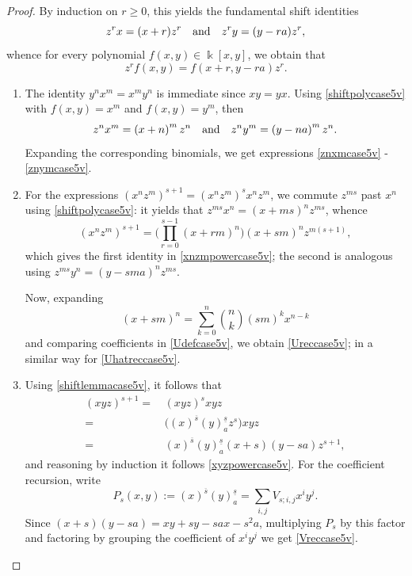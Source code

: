 \documentclass{amsart}
\theoremstyle{definition}
\theoremstyle{remark}
\numberwithin{equation}{section}
\begin{document}
\begin{proof} 
By induction on $r\ge 0$, this yields the fundamental shift identities
\begin{equation}\label{shiftlemmacase5v}
z^{r}x=(x+r)z^{r} \quad {\rm and} \quad z^{r}y=(y-ra)z^{r},
\end{equation}
whence for every polynomial $f(x,y)\in\Bbbk[x,y]$, we obtain that 
\begin{equation}\label{shiftpolycase5v}
z^{r}f(x,y)=f(x+r,y-ra) z^{r}.
\end{equation}
\begin{enumerate}
\item [\rm (1)] The identity $y^n x^m=x^m y^n$ is immediate since $xy=yx$. Using \eqref{shiftpolycase5v} with $f(x,y)=x^m$ and $f(x,y)=y^m$, then
$$
z^n x^m = \left(x + n\right)^m z^n \quad {\rm and} \quad z^n y^m = \left(y - na\right)^m z^n.
$$
Expanding the corresponding binomials, we get expressions \eqref{znxmcase5v} - \eqref{znymcase5v}.

\item [\rm (2)] For the expressions $(x^n z^m)^{s+1}=(x^n z^m)^s x^n z^m$, we commute $z^{ms}$ past $x^n$ using \eqref{shiftpolycase5v}: it yields that $z^{ms}x^n=(x+ms)^n z^{ms}$, whence 
\[
\left(x^n z^m\right)^{s+1} = \Big(\prod_{r=0}^{s-1}\left(x + rm\right)^n\Big)\left(x+sm\right)^n z^{m(s+1)},
\]
which gives the first identity in \eqref{xnzmpowercase5v}; the second is analogous using $z^{ms}y^n=(y-sma)^n z^{ms}$. 

Now, expanding 
$$
\left(x + sm\right)^n = \sum_{k=0}^{n}\binom{n}{k}(sm)^k x^{n-k}
$$ 
and comparing coefficients in \eqref{Udefcase5v}, we obtain \eqref{Ureccase5v}; in a similar way for  \eqref{Uhatreccase5v}.
\item [\rm (3)] Using \eqref{shiftlemmacase5v}, it follows that 
\begin{align*}
        (xyz)^{s+1} = &\, (xyz)^s xyz \\
        = &\, \Big((x)^{\overline{s}}(y)^{\underline{s}}_{a}z^{s}\Big)xyz \\
        = &\, (x)^{\overline{s}}(y)^{\underline{s}}_{a}(x+s)(y-sa)z^{s+1},
\end{align*}
and reasoning by induction it follows \eqref{xyzpowercase5v}. For the coefficient recursion, write 
$$
P_s(x,y):=(x)^{\overline{s}} (y)^{\underline{s}}_{a} = \sum_{i,j}V_{s;i,j}x^i y^j.
$$
Since $(x+s)(y-sa) = xy+s y-sa x-s^2a$, multiplying $P_s$ by this factor and factoring by grouping the coefficient of $x^i y^j$ we get \eqref{Vreccase5v}.


\end{enumerate}
\end{proof}
\end{document}
